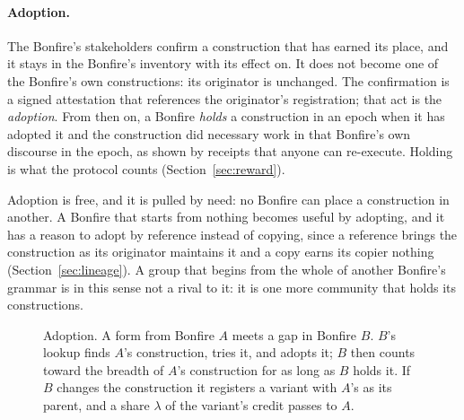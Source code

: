 \paragraph{Adoption.} The Bonfire's stakeholders confirm a construction that has earned its place, and it stays in the Bonfire's inventory with its effect on. It does not become one of the Bonfire's own
constructions: its originator is unchanged. The confirmation is a signed attestation that references the
originator's registration; that act is the \emph{adoption}. From then on, a Bonfire \emph{holds} a construction in
an epoch when it has adopted it and the construction did necessary work in that Bonfire's own discourse in the
epoch, as shown by receipts that anyone can re-execute. Holding is what the protocol counts
(Section~\ref{sec:reward}).

Adoption is free, and it is pulled by need: no Bonfire can place a construction in another. A Bonfire that starts
from nothing becomes useful by adopting, and it has a reason to adopt by reference instead of copying, since a
reference brings the construction as its originator maintains it and a copy earns its copier nothing
(Section~\ref{sec:lineage}). A group that begins from the whole of another Bonfire's grammar is in this sense not a
rival to it: it is one more community that holds its constructions.

\begin{figure}[!htb]
\centering

\caption{Adoption. A form from Bonfire $A$ meets a gap in Bonfire $B$. $B$'s lookup finds $A$'s construction, tries
it, and adopts it; $B$ then counts toward the breadth of $A$'s construction for as long as $B$ holds it. If $B$
changes the construction it registers a variant with $A$'s as its parent, and a share $\lambda$ of the variant's
credit passes to $A$.}\label{fig:adoption}
\end{figure}
